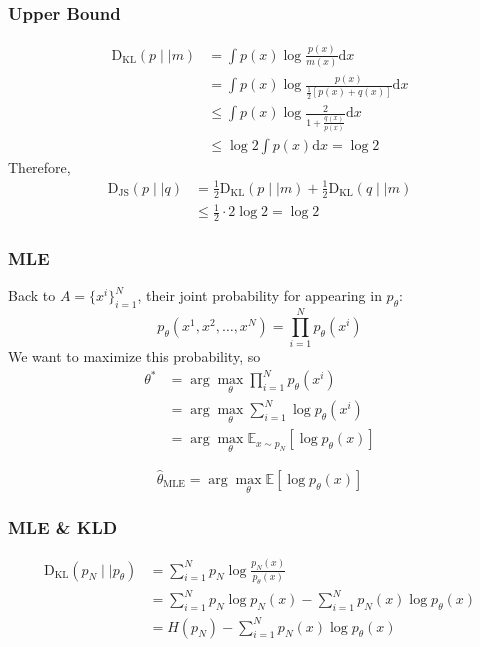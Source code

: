 \documentclass{beamer}
\begin{document}
\begin{frame}[t]
\frametitle{Upper Bound}
\begin{align*}
    \mathrm{D_{KL}}(p\mid\mid m)&=\int p(x)\log\frac{p(x)}{m(x)}\text{d}x\\
    &=\int p(x)\log\frac{p(x)}{\frac{1}{2}[p(x)+q(x)]}\text{d}x\\
    &\le \int p(x)\log \frac{2}{1+\frac{q(x)}{p(x)}}\text{d}x\\
    &\le \log{2}\int p(x)\text{d}x=\log{2}
\end{align*}
Therefore,
\begin{align*}
    \mathrm{D_{JS}}(p\mid\mid q)&=\frac{1}{2}\mathrm{D_{KL}}(p\mid\mid m)+\frac{1}{2}\mathrm{D_{KL}}(q\mid\mid m)\\
    &\le \frac{1}{2}\cdot 2\log2=\log2
\end{align*}
\end{frame}

\begin{frame}[t]
\frametitle{MLE}
Back to $A=\{x^i\}_{i=1}^N$, their joint probability for appearing in $p_\theta$:\\
$$
p_\theta(x^1,x^2,\dots, x^N)=\prod_{i=1}^Np_\theta(x^i)
$$
We want to maximize this probability, so
\begin{align*}
\theta^*&=\arg\max_\theta\prod_{i=1}^N p_\theta(x^i)\\
&=\arg\max_\theta\sum_{i=1}^N\log p_\theta(x^i)\\
&=\arg\max_\theta\mathbb{E}_{x\sim p_N}[\log p_\theta(x)]
\end{align*}

\begin{tcolorbox}[colback=blue!1!white,
                  colframe=blue!75!black]
$$
\hat\theta_{\text{MLE}}=\arg\max_\theta \mathbb{E}\left[\log p_\theta(x)\right]
$$
\end{tcolorbox}
\end{frame}

\begin{frame}[t]
\frametitle{MLE \& KLD}
\begin{align*}
    \mathrm{D_{KL}}(p_N\mid\mid p_\theta)&=\sum _{i=1}^Np_{N}\log\frac{p_N(x)}{p_\theta(x)}\\
    &=\sum_{i=1}^N p_N\log p_N(x)-\sum_{i=1}^N p_N(x)\log p_\theta(x)\\
    &=H(p_N)-\sum_{i=1}^N p_N(x)\log p_\theta(x)
\end{align*}
\end{frame}
\end{document}
